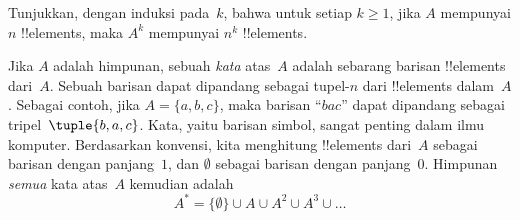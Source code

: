 \documentclass[../../../include/open-logic-section]{subfiles}
\begin{document}
\begin{prob}
Tunjukkan, dengan induksi pada~$k$, bahwa untuk setiap $k \ge 1$, jika
$A$ mempunyai $n$ !!{element}s, maka $A^k$ mempunyai $n^k$
!!{element}s.
\end{prob}

\begin{ex}
Jika $A$ adalah himpunan, sebuah \emph{kata} atas~$A$ adalah sebarang
barisan !!{element}s dari~$A$. Sebuah barisan dapat dipandang sebagai
tupel-$n$ dari !!{element}s dalam~$A$. Sebagai contoh, jika
$A = \{a, b, c\}$, maka barisan ``$bac$'' dapat dipandang sebagai
tripel~$\tuple{b, a, c}$. Kata, yaitu barisan simbol, sangat penting
dalam ilmu komputer. Berdasarkan konvensi, kita menghitung
!!{element}s dari~$A$ sebagai barisan dengan panjang~$1$, dan
$\emptyset$ sebagai barisan dengan panjang~$0$. Himpunan \emph{semua}
kata atas~$A$ kemudian adalah
\[
A^* = \{\emptyset\} \cup A \cup A^2 \cup A^3 \cup \dots
\]
\end{ex}
\end{document}
